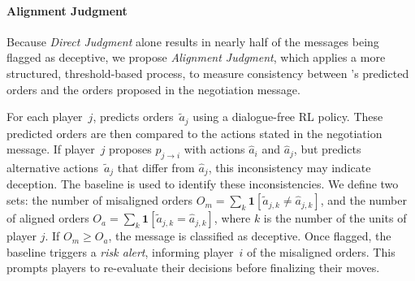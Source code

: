 \paragraph{Alignment Judgment}
Because \emph{Direct Judgment} alone results in nearly half of the messages being flagged as deceptive, we propose \emph{Alignment Judgment}, which applies a more structured, threshold-based process, to measure consistency between \cicero's predicted orders and the orders proposed in the negotiation message.

For each player~\(j\), \cicero predicts orders~\(\tilde{a}_j\) using a dialogue-free RL policy. These predicted orders are then compared to the actions stated in the negotiation message. If player~\(j\) proposes \(p_{j \to i}\) with actions \( \hat{a}_i\) and \( \hat{a}_j\), but \cicero predicts alternative actions~\(\tilde{a}_j\) that differ from \(\hat{a}_j\), this inconsistency may indicate deception. The baseline is used to identify these inconsistencies. We define two sets: the number of misaligned orders \( O_m = \sum_k \boldsymbol{1}[\tilde{a}_{j,k} \neq \hat{a}_{j,k}] \), and the number of aligned orders \( O_a = \sum_k \boldsymbol{1}[\tilde{a}_{j,k} = \hat{a}_{j,k}] \), where \(k\) is the number of the units of player \(j\).
If \( O_m \geq O_a \), the message is classified as deceptive. Once flagged, the baseline triggers a \emph{risk alert}, informing player~\(i\) of the misaligned orders. This prompts players to re-evaluate their decisions before finalizing their moves.
